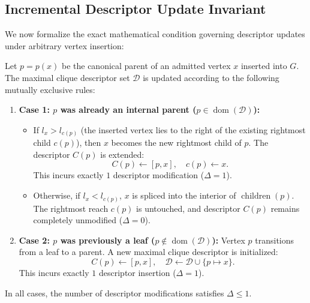 \subsection{Incremental Descriptor Update Invariant}

We now formalize the exact mathematical condition governing descriptor updates under arbitrary vertex insertion:

\begin{theorem}
\label{thm:incremental_invariant}
Let $p = p(x)$ be the canonical parent of an admitted vertex $x$ inserted into $G$. The maximal clique descriptor set $\mathcal{D}$ is updated according to the following mutually exclusive rules:
\begin{enumerate}
    \item \textbf{Case 1: $p$ was already an internal parent ($p \in \operatorname{dom}(\mathcal{D})$):}
    \begin{itemize}
        \item If $l_x > l_{c(p)}$ (the inserted vertex lies to the right of the existing rightmost child $c(p)$), then $x$ becomes the new rightmost child of $p$. The descriptor $C(p)$ is extended:
        \begin{equation}
            C(p) \leftarrow [p, x], \quad c(p) \leftarrow x.
        \end{equation}
        This incurs exactly $1$ descriptor modification ($\Delta = 1$).
        \item Otherwise, if $l_x < l_{c(p)}$, $x$ is spliced into the interior of $\operatorname{children}(p)$. The rightmost reach $c(p)$ is untouched, and descriptor $C(p)$ remains completely unmodified ($\Delta = 0$).
    \end{itemize}
    \item \textbf{Case 2: $p$ was previously a leaf ($p \notin \operatorname{dom}(\mathcal{D})$):}
    Vertex $p$ transitions from a leaf to a parent. A new maximal clique descriptor is initialized:
    \begin{equation}
        C(p) \leftarrow [p, x], \quad \mathcal{D} \leftarrow \mathcal{D} \cup \{p \mapsto x\}.
    \end{equation}
    This incurs exactly $1$ descriptor insertion ($\Delta = 1$).
\end{enumerate}
In all cases, the number of descriptor modifications satisfies $\Delta \le 1$.
\end{theorem}
